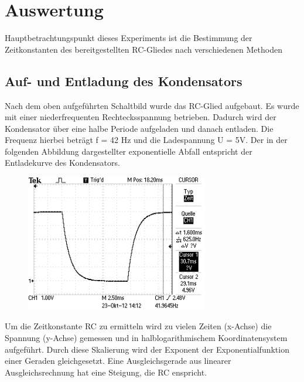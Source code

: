 \section{Auswertung}
Hauptbetrachtungspunkt dieses Experiments ist die Bestimmung der Zeitkonstanten des bereitgestellten RC-Gliedes nach verschiedenen Methoden

\subsection{Auf- und Entladung des Kondensators}
Nach dem oben aufgeführten Schaltbild wurde das RC-Glied aufgebaut. Es wurde mit einer niederfrequenten Rechtecksspannung betrieben.
Dadurch wird der Kondensator über eine halbe Periode aufgeladen und danach entladen. Die Frequenz hierbei beträgt f = 42 Hz und die Ladespannung
U = 5V. Der in der folgenden Abbildung dargestellter exponentielle Abfall entspricht der Entladekurve des Kondensators.


\begin{figure}[htbp]
\includegraphics[width=8cm] {_pics/TEK0000.JPG}
\centering
\end{figure}


Um die Zeitkonstante RC zu ermitteln wird zu vielen Zeiten (x-Achse) die Spannung (y-Achse) gemessen und in halblogarithmischem Koordinatensystem
aufgeführt. Durch diese Skalierung wird der Exponent der Exponentialfunktion einer Geraden gleichgesetzt. Eine Ausgleichsgerade aus linearer 
Ausgleichsrechnung hat eine Steigung, die RC enspricht.\\ 

